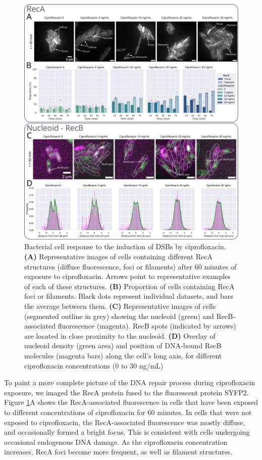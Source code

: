 \begin{figure}[htbp]
    \centering
    \includegraphics[width=.8\textwidth]{Figures/Fig3_cell_response.pdf}
    \caption{Bacterial cell response to the induction of DSBs by ciprofloxacin. \textbf{(A)} Representative images of cells containing different RecA structures (diffuse fluorescence, foci or filaments) after 60 minutes of exposure to ciprofloxacin. Arrows point to representative examples of each of these structures. \textbf{(B)} Proportion of cells containing RecA foci or filaments. Black dots represent individual datasets, and bars the average between them. \textbf{(C)} Representative images of cells (segmented outline in grey) showing the nucleoid (green) and RecB-associated fluorescence (magenta). RecB spots (indicated by arrows) are located in close proximity to the nucleoid. \textbf{(D)} Overlay of nucleoid density (green area) and position of DNA-bound RecB molecules (magenta bars) along the cell's long axis, for different ciprofloxacin concentrations (0 to 30 ng/mL)}
    \label{Fig:reca_nucleoid}
\end{figure}

To paint a more complete picture of the DNA repair process during ciprofloxacin exposure, we imaged the RecA protein fused to the fluorescent protein SYFP2. Figure \ref{Fig:reca_nucleoid}A shows the RecA-associated fluorescence in cells that have been exposed to different concentrations of ciprofloxacin for 60 minutes. In cells that were not exposed to ciprofloxacin, the RecA-associated fluorescence was mostly diffuse, and occasionally formed a bright focus. This is consistent with cells undergoing occasional endogenous DNA damage. As the ciprofloxacin concentration increases, RecA foci become more frequent, as well as filament structures.

